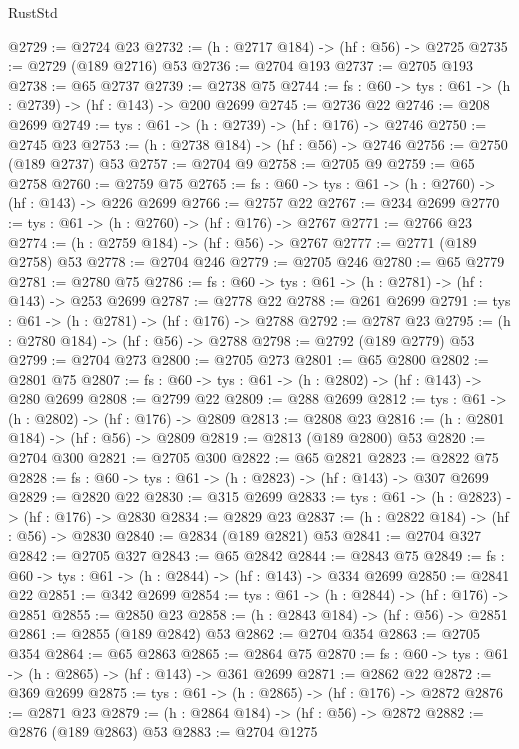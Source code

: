 \begin{lexlean}{RustStd}
\begin{coremodule}
{\begin{coremodule}
{{{{{{{{{{{{{{{{{{{{{@2729 := @2724 @23
@2732 := (h : @2717 @184) -> (hf : @56) -> @2725
@2735 := @2729 (@189 @2716) @53
@2736 := @2704 @193
@2737 := @2705 @193
@2738 := @65 @2737
@2739 := @2738 @75
@2744 := {fs : @60} -> {tys : @61} -> (h : @2739) -> (hf : @143) -> @200 @2699
@2745 := @2736 @22
@2746 := @208 @2699
@2749 := {tys : @61} -> (h : @2739) -> (hf : @176) -> @2746
@2750 := @2745 @23
@2753 := (h : @2738 @184) -> (hf : @56) -> @2746
@2756 := @2750 (@189 @2737) @53
@2757 := @2704 @9
@2758 := @2705 @9
@2759 := @65 @2758
@2760 := @2759 @75
@2765 := {fs : @60} -> {tys : @61} -> (h : @2760) -> (hf : @143) -> @226 @2699
@2766 := @2757 @22
@2767 := @234 @2699
@2770 := {tys : @61} -> (h : @2760) -> (hf : @176) -> @2767
@2771 := @2766 @23
@2774 := (h : @2759 @184) -> (hf : @56) -> @2767
@2777 := @2771 (@189 @2758) @53
@2778 := @2704 @246
@2779 := @2705 @246
@2780 := @65 @2779
@2781 := @2780 @75
@2786 := {fs : @60} -> {tys : @61} -> (h : @2781) -> (hf : @143) -> @253 @2699
@2787 := @2778 @22
@2788 := @261 @2699
@2791 := {tys : @61} -> (h : @2781) -> (hf : @176) -> @2788
@2792 := @2787 @23
@2795 := (h : @2780 @184) -> (hf : @56) -> @2788
@2798 := @2792 (@189 @2779) @53
@2799 := @2704 @273
@2800 := @2705 @273
@2801 := @65 @2800
@2802 := @2801 @75
@2807 := {fs : @60} -> {tys : @61} -> (h : @2802) -> (hf : @143) -> @280 @2699
@2808 := @2799 @22
@2809 := @288 @2699
@2812 := {tys : @61} -> (h : @2802) -> (hf : @176) -> @2809
@2813 := @2808 @23
@2816 := (h : @2801 @184) -> (hf : @56) -> @2809
@2819 := @2813 (@189 @2800) @53
@2820 := @2704 @300
@2821 := @2705 @300
@2822 := @65 @2821
@2823 := @2822 @75
@2828 := {fs : @60} -> {tys : @61} -> (h : @2823) -> (hf : @143) -> @307 @2699
@2829 := @2820 @22
@2830 := @315 @2699
@2833 := {tys : @61} -> (h : @2823) -> (hf : @176) -> @2830
@2834 := @2829 @23
@2837 := (h : @2822 @184) -> (hf : @56) -> @2830
@2840 := @2834 (@189 @2821) @53
@2841 := @2704 @327
@2842 := @2705 @327
@2843 := @65 @2842
@2844 := @2843 @75
@2849 := {fs : @60} -> {tys : @61} -> (h : @2844) -> (hf : @143) -> @334 @2699
@2850 := @2841 @22
@2851 := @342 @2699
@2854 := {tys : @61} -> (h : @2844) -> (hf : @176) -> @2851
@2855 := @2850 @23
@2858 := (h : @2843 @184) -> (hf : @56) -> @2851
@2861 := @2855 (@189 @2842) @53
@2862 := @2704 @354
@2863 := @2705 @354
@2864 := @65 @2863
@2865 := @2864 @75
@2870 := {fs : @60} -> {tys : @61} -> (h : @2865) -> (hf : @143) -> @361 @2699
@2871 := @2862 @22
@2872 := @369 @2699
@2875 := {tys : @61} -> (h : @2865) -> (hf : @176) -> @2872
@2876 := @2871 @23
@2879 := (h : @2864 @184) -> (hf : @56) -> @2872
@2882 := @2876 (@189 @2863) @53
@2883 := @2704 @1275
}}}}}}}}}}}}}}}}}}}}}
\end{coremodule}}
\end{coremodule}
\end{lexlean}
